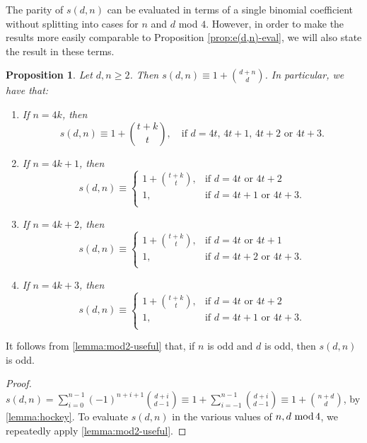 \documentclass[11pt,a4paper,leqno]{amsart}
\newtheorem{proposition}[theorem]{Proposition}
\theoremstyle{definition}
\theoremstyle{remark}
\newenvironment{clist}[1]
{\begin{enumerate}[\normalfont #1]}
{\end{enumerate}}
\renewcommand{\mod}{\,\,\text{\normalfont mod}\,}
\begin{document}
The parity of $s(d,n)$ can be evaluated in terms of a single binomial coefficient without splitting into cases for $n$ and $d$ mod $4$. However, in order to make the results more easily comparable to Proposition \ref{prop:e(d,n)-eval}, we will also state the result in these terms.

\begin{proposition} \label{prop:s(d,n)-eval}
Let $d, n \ge 2$. Then $s(d,n) \equiv 1 + \binom{d+n}{d}$. In particular, we have that:
\begin{clist}{(i)}
\item
If $n = 4k$, then
\[ s(d,n) \equiv \textstyle  
1+ \binom{t+k}{t}, \quad \text{if $d=4t$, $4t+1$, $4t+2$ or $4t+3$.}
 \]	
\item
If $n = 4k+1$, then
\[ s(d,n) \equiv 
\begin{cases}
1+ \binom{t+k}{t}, & \text{if $d=4t$ or $4t+2$} \\
1, & \text{if $d=4t+1$ or $4t+3$.} \\
\end{cases}
 \]	
\item 
 If $n = 4k+2$, then
\[ s(d,n) \equiv 
\begin{cases}
1+ \binom{t+k}{t}, & \text{if $d=4t$ or $4t+1$} \\
1, & \text{if $d=4t+2$ or $4t+3$.} \\
\end{cases}
 \]	
\item
 If $n = 4k+3$, then
\[ s(d,n) \equiv 
\begin{cases}
1+ \binom{t+k}{t}, & \text{if $d=4t$ or $4t+2$} \\
1, & \text{if $d=4t+1$ or $4t+3$.} \\
\end{cases}
 \]	
\end{clist}
\end{proposition}

It follows from \cref{lemma:mod2-useful}  that, if $n$ is odd and $d$ is odd, then $s(d,n)$ is odd.

\begin{proof}
$s(d,n) = \sum_{i=0}^{n-1} (-1)^{n+i+1}\binom{d+i}{d-1} \equiv 1+\sum_{i=-1}^{n-1} \binom{d+i}{d-1} \equiv 1+\binom{n+d}{d}$, by \cref{lemma:hockey}.	 To evaluate $s(d,n)$ in the various values of $n, d \mod 4$, we repeatedly apply \cref{lemma:mod2-useful}.
\end{proof}

%
%
\end{document}
